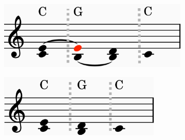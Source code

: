 \documentclass[12pt,a4paper,twoside,openright]{report}
\theoremstyle{definition}
\begin{document}
\begin{figure}[h]
  \centering
  \begin{subfigure}[t]{.44\textwidth}
    \centering\includegraphics[keepaspectratio,width=\textwidth]{prep/harm/unreducedScore.png}
    \caption{}
    \label{fig:pvHarmonyUnreducedInner}
  \end{subfigure}
  \begin{subfigure}[t]{.44\textwidth}
    \centering\includegraphics[keepaspectratio,width=0.85\textwidth]{prep/harm/reducedScore.png}
    \caption{}
    \label{fig:pvHarmonyReducedInner}
  \end{subfigure}


\end{figure}
\end{document}
